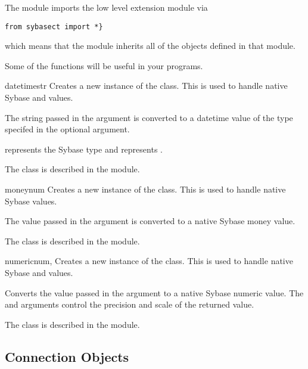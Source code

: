 The  module imports the low level 
extension module via

\begin{verbatim}
from sybasect import *}
\end{verbatim}

which means that the  module inherits all of the
objects defined in that module.

Some of the functions will be useful in your programs.

\begin{funcdesc}{datetime}{str }
Creates a new instance of the  class.  This is used to
handle native Sybase  and  values.

The string passed in the  argument is converted to a datetime
value of the type specifed in the optional  argument.

 represents the  Sybase
type and  represents
.

The  class is described in the 
module.
\end{funcdesc}

\begin{funcdesc}{money}{num}
Creates a new instance of the  class.  This is
used to handle native Sybase  values.

The value passed in the  argument is converted to a native
Sybase money value.

The  class is described in the 
module.
\end{funcdesc}

\begin{funcdesc}{numeric}{num, }
Creates a new instance of the  class.  This is used to
handle native Sybase  and  values.

Converts the value passed in the  argument to a native Sybase
numeric value.  The  and  arguments control
the precision and scale of the returned value.

The  class is described in the 
module.
\end{funcdesc}

\subsection{Connection Objects}

